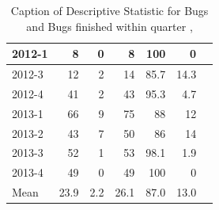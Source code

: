 \documentclass[UKenglish]{ifimaster}  %
\begin{document}
\begin{table}[!htbp]
\begin{adjustwidth}{-2.5cm}{}
{{\begin{tabular}{ | l | r | r | r | r | r | r | }
2012-1 & 8 & 0 & 8 & 100 & 0 \\ \hline
2012-3 & 12 & 2 & 14 & 85.7 & 14.3 \\ \hline
2012-4 & 41 & 2 & 43 & 95.3 & 4.7 \\ \hline
2013-1 & 66 & 9 & 75 & 88 & 12 \\ \hline
2013-2 & 43 & 7 & 50 & 86 & 14 \\ \hline
2013-3 & 52 & 1 & 53 & 98.1 & 1.9 \\ \hline
2013-4 & 49 & 0 & 49 & 100 & 0 \\ \hline
Mean & 23.9&2.2&26.1&87.0&13.0 \\ \hline
\end{tabular}
}
}
\end{adjustwidth}
\caption[Optional caption for list of figures]{Caption of Descriptive Statistic for Bugs and Bugs finished within quarter  , }
\label{DS:6:5} %
\end{table}


 
 
 
\end{document}

